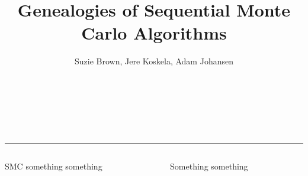 \documentclass[final, 12pt]{beamer}
\title{Genealogies of Sequential Monte Carlo Algorithms}
\author{Suzie Brown, Jere Koskela, Adam Johansen}
\institute{Department of Statistics, University of Warwick}
\date{}
\newlength{\colwidth}
\begin{document}
\begin{frame}

\vspace*{-1340pt}

\centering
{}

\vspace*{-160pt}

\huge{\inserttitle}\\[10pt]
\Large{\insertauthor}\\[7pt]
\normalsize{\insertinstitute}\\[35pt]
\hrule

\begin{columns}
\begin{column}{\colwidth}
\begin{block}{SMC something something}

\end{block}
\end{column}

\begin{column}{\colwidth}
\begin{block}{Something something}

\end{block}
\end{column}
\end{columns}

\end{frame}
\end{document}

